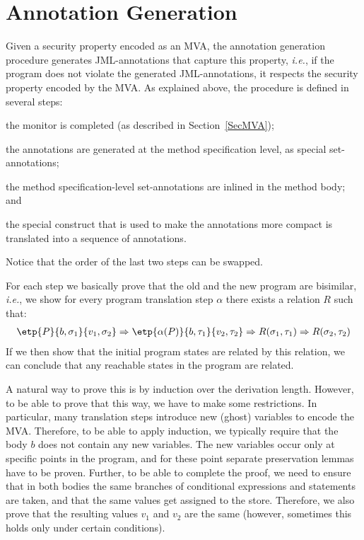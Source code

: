 \section{Annotation Generation}\label{SecAnnotGen}

Given a security property encoded as an MVA, the annotation generation
procedure generates JML-annotations that capture this property,
\emph{i.e.}, if the program does not violate the generated %
JML-annotations, it respects the security property encoded by the
MVA. As explained above, the procedure is defined in several steps:
\begin{inparaenum}
\item the monitor is completed (as described in Section~\ref{SecMVA});
\item the annotations are generated at the method specification level,
as special set-annotations;
\item the method specification-level set-annotations are inlined in
the method body; and
\item the special \CaseJML construct that is used to make the
annotations more compact is translated into a sequence of \Set
annotations.
\end{inparaenum}
Notice that the order of the last two steps can be swapped.

For each step we basically prove that the old and the new program are
bisimilar, \emph{i.e.}, we show for every program translation step
\(\alpha\) there exists a relation \(R\) such that:
\[
\begin{array}{l}
\etp{P}{b,\sigma_1}{v_1, \sigma_2} \Rightarrow
\etp{\alpha(P)}{b, \tau_1}{v_2, \tau_2} \Rightarrow
R(\sigma_1, \tau_1) \Rightarrow
R(\sigma_2, \tau_2)
\end{array}
\]
If we then show that the initial program states are related by this
relation, we can conclude that any reachable states in the program are
related.

A natural way to prove this is by induction over the derivation
length. However, to be able to prove that this way, we have to make
some restrictions. In particular, many translation steps introduce new
(ghost) variables to encode the MVA. Therefore, to be able to apply
induction, we typically require that the body \(b\) does not contain
any new variables. The new variables occur only at specific points in
the program, and for these point separate preservation lemmas have to
be proven. Further, to be able to complete the proof, we need to
ensure that in both bodies the same branches of conditional
expressions and statements are taken, and that the same values get
assigned to the store. Therefore, we also prove that the resulting
values \(v_1\) and \(v_2\) are the same (however, sometimes this holds
only under certain conditions).



